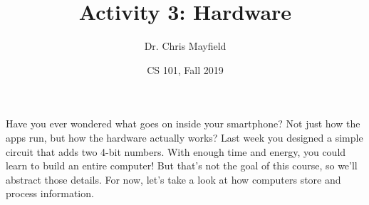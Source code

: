 \documentclass[12pt]{article}
\title{Activity 3: Hardware}
\author{Dr. Chris Mayfield}
\date{CS 101, Fall 2019}
\begin{document}
\maketitle

Have you ever wondered what goes on inside your smartphone?
Not just how the apps run, but how the hardware actually works?
Last week you designed a simple circuit that adds two 4-bit numbers.
With enough time and energy, you could learn to build an entire computer!
But that's not the goal of this course, so we'll abstract those details.
For now, let's take a look at how computers store and process information.



\end{document}
